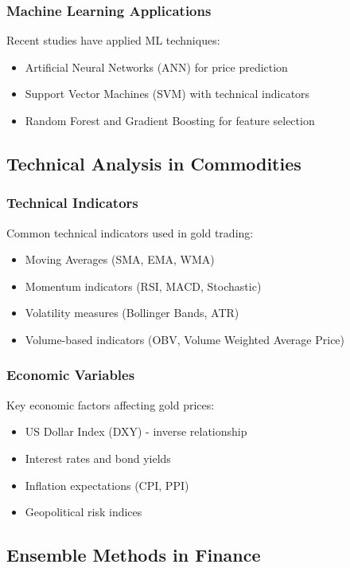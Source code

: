 \documentclass[12pt,a4paper]{article}
\begin{document}
\subsubsection{Machine Learning Applications}
Recent studies have applied ML techniques:
\begin{itemize}
    \item Artificial Neural Networks (ANN) for price prediction \cite{shafiee2010gold}
    \item Support Vector Machines (SVM) with technical indicators \cite{gunduz2017gold}
    \item Random Forest and Gradient Boosting for feature selection \cite{zhang2018gold}
\end{itemize}

\subsection{Technical Analysis in Commodities}

\subsubsection{Technical Indicators}
Common technical indicators used in gold trading:
\begin{itemize}
    \item Moving Averages (SMA, EMA, WMA)
    \item Momentum indicators (RSI, MACD, Stochastic)
    \item Volatility measures (Bollinger Bands, ATR)
    \item Volume-based indicators (OBV, Volume Weighted Average Price)
\end{itemize}

\subsubsection{Economic Variables}
Key economic factors affecting gold prices:
\begin{itemize}
    \item US Dollar Index (DXY) - inverse relationship
    \item Interest rates and bond yields
    \item Inflation expectations (CPI, PPI)
    \item Geopolitical risk indices
\end{itemize}

\subsection{Ensemble Methods in Finance}
\end{document}
